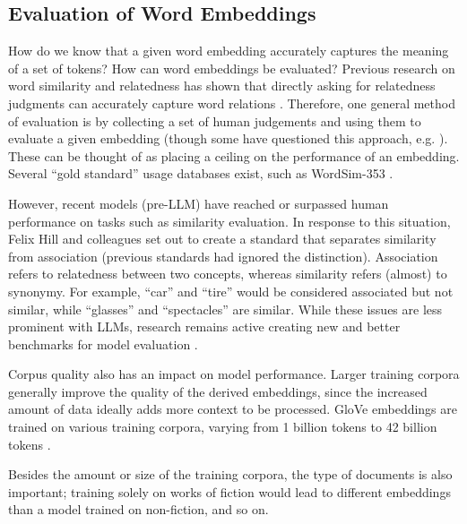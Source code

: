 \subsection{Evaluation of Word Embeddings}


How do we know that a given word embedding accurately captures the meaning of a set of tokens? How can word embeddings be evaluated? Previous research on word similarity and relatedness has shown that directly asking for relatedness judgments can accurately capture word relations \cite{finkelstein2001placing}. Therefore, one general method of evaluation is by collecting a set of human judgements and using them to evaluate a given embedding (though some have questioned this approach, e.g. \cite{richie2022inter}). These can be thought of as placing a ceiling on the performance of an embedding. Several ``gold standard'' usage databases exist, such as WordSim-353 \cite{finkelstein2001placing, agirre2009study}. 

However, recent models (pre-LLM) have reached or surpassed human performance on tasks such as similarity evaluation. In response to this situation, Felix Hill and colleagues \cite{hill2015simlex} set out to create a standard that separates similarity from association (previous standards had ignored the distinction). Association refers to relatedness between two concepts, whereas similarity refers (almost) to synonymy. For example, ``car'' and ``tire'' would be considered associated but not similar, while ``glasses'' and ``spectacles'' are similar. While these issues are less prominent with LLMs, research remains active creating new and better benchmarks for model evaluation \cite{bugliarello2023measuring}.

Corpus quality also has an impact on model performance. Larger training corpora generally improve the quality of the derived embeddings, since the increased amount of data ideally adds more context to be processed. GloVe embeddings are trained on various training corpora, varying from 1 billion tokens to 42 billion tokens \cite{pennington2014glove}.

Besides the amount or size of the training corpora, the type of documents is also important; training solely on works of fiction would lead to different embeddings than a model trained on non-fiction, and so on.

